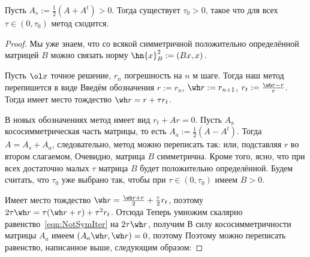 \documentclass[a4paper]{article}
\begin{document}
\begin{theorem}
Пусть $A_s := \frac12(A + A^t) > 0$. Тогда существует $\tau_0 > 0$,
такое что для всех $\tau \in (0,\tau_0)$ метод  сходится.
\end{theorem}
\begin{proof}
Мы уже знаем, что со всякой симметричной положительно определённой
матрицей $B$ можно связать норму $\hn{x}^2_B := (Bx,x)$.

Пусть $\ol x$ точное решение, $r_n$ погрешность на $n$ м шаге. Тогда
наш метод перепишется в виде   Введём обозначения $r := r_n$, $\wh r := r_{n+1}$, $r_t :=
\frac{\wh r - r}{\tau}$. Тогда имеет место тождество $\wh r = r + \tau
r_t$.

В новых обозначениях метод имеет вид $r_t + Ar = 0$. Пусть $A_a$
кососимметрическая часть матрицы, то есть $A_a := \frac12(A -
A^t)$. Тогда $A = A_s + A_a$, следовательно, метод можно переписать
так:  или, подставляя $r$ во втором
слагаемом,   Очевидно, матрица $B$ симметрична. Кроме
того, ясно, что при всех достаточно малых $\tau$ матрица $B$ будет
положительно определённой.  Будем считать, что $\tau_0$ уже выбрано
так, чтобы при $\tau \in (0,\tau_0)$ имеем $B > 0$.

Имеет место тождество $\wh r = \frac{\wh r + r}{2} + \frac{\tau}{2}
r_t$, поэтому $2\tau \wh r = \tau (\wh r + r) + \tau^2 r_t$.  Отсюда
Теперь умножим скалярно равенство~\eqref{eqn:NotSymIter} на $2\tau \wh
r$, получим   В силу
кососимметричности матрицы $A_a$ имеем $(A_a \wh r, \wh r) = 0$,
поэтому   Поэтому можно переписать равенство,
написанное выше, следующим образом: 


\end{proof}
\end{document}

